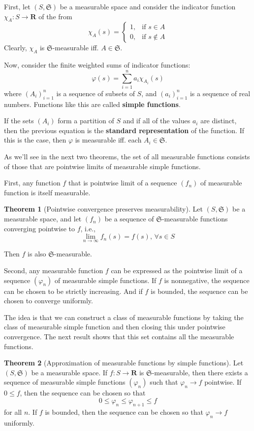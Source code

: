 \documentclass[12pt,a4paper]{article}
\theoremstyle{definition}
\newtheorem{theorem}{Theorem}[section]
\begin{document}
First, let $(S, \mathfrak{S})$ be a measurable space and consider the indicator function $\chi_A : S \longrightarrow \textbf{R}$ of the from
\[
\chi_A (s) = \begin{cases}
	1, & \text{if } s \in A\\
	0, & \text{if } s \notin A
	\end{cases}
\]
Clearly, $\chi_A$ is $\mathfrak{S}$-measurable iff. $A \in \mathfrak{S}$.

Now, consider the finite weighted sums of indicator functions:
\[
	\varphi(s) = \sum_{i=1}^n a_i \chi_{A_i}(s)
\]
where $(A_i)_{i=1}^n$ is a sequence of subsets of $S$, and $(a_i)_{i=1}^n$ is a sequence of real numbers. Functions like this are called \textbf{simple functions}.

If the sets $(A_i)$ form a partition of $S$ and if all of the values $a_i$ are distinct, then the previous equation is the \textbf{standard representation} of the function. If this is the case, then $\varphi$ is measurable iff. each $A_i \in \mathfrak{S}$.

As we'll see in the next two theorems, the set of all measurable functions consists of those that are pointwise limits of measurable simple functions.

First, any function $f$ that is pointwise limit of a sequence $(f_n)$ of measurable function is itself measurable.

\begin{theorem}[Pointwise convergence preserves measurability]
	Let $(S, \mathfrak{S})$ be a measurable space, and let $(f_n)$ be a sequence of $\mathfrak{S}$-measurable functions converging pointwise to $f$, i.e.,
	\[
		\lim_{n \to \infty} f_n(s) = f(s), \, \forall s \in S
	\]

	Then $f$ is also $\mathfrak{S}$-measurable.
\end{theorem}

Second, any measurable function $f$ can be expressed as the pointwise limit of a sequence $(\varphi_n)$ of measurable simple functions. If $f$ is nonnegative, the sequence can be chosen to be strictly increasing. And if $f$ is bounded, the sequence can be chosen to converge uniformly.

The idea is that we can construct a class of measurable functions by taking the class of measurable simple function and then closing this under pointwise convergence. The next result shows that this set contains all the measurable functions.

\begin{theorem}[Approximation of measurable functions by simple functions]
	Let $(S, \mathfrak{S})$ be a measurable space. If $f : S \longrightarrow \textbf{R}$ is $\mathfrak{S}$-measurable, then there exists a sequence of measurable simple functions $(\varphi_n)$ such that $\varphi_n \longrightarrow f$ pointwise. If $0 \leq f$, then the sequence can be chosen so that 
	\[
		0 \leq \varphi_n \leq \varphi_{n+1} \leq f
	\]
	for all $n$. If $f$ is bounded, then the sequence can be chosen so that $\varphi_n \longrightarrow f$ uniformly.
\end{theorem}
\end{document}
